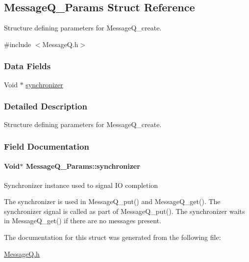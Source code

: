 \subsection{Message\-Q\-\_\-\-Params Struct Reference}
\label{struct_message_q___params}


Structure defining parameters for Message\-Q\-\_\-create.  




{\ttfamily \#include $<$Message\-Q.\-h$>$}

\subsubsection*{Data Fields}
\begin{DoxyCompactItemize}
\item 
Void $\ast$ \hyperlink{struct_message_q___params_a6f428033e1aa39162fd51a6d8ade1c9d}{synchronizer}
\end{DoxyCompactItemize}


\subsubsection{Detailed Description}
Structure defining parameters for Message\-Q\-\_\-create. 

\subsubsection{Field Documentation}
\paragraph[{synchronizer}]{\setlength{\rightskip}{0pt plus 5cm}Void$\ast$ Message\-Q\-\_\-\-Params\-::synchronizer}\label{struct_message_q___params_a6f428033e1aa39162fd51a6d8ade1c9d}
Synchronizer instance used to signal I\-O completion \begin{DoxyVerb}   The synchronizer is used in MessageQ_put() and MessageQ_get().
   The synchronizer signal is called as part of MessageQ_put().
   The synchronizer waits in MessageQ_get() if there are no messages
   present.\end{DoxyVerb}
 

The documentation for this struct was generated from the following file\-:\begin{DoxyCompactItemize}
\item 
\hyperlink{_message_q_8h}{Message\-Q.\-h}\end{DoxyCompactItemize}
